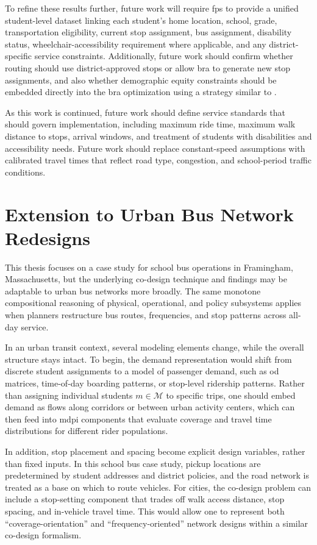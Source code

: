 To refine these results further, future work will require \gls{fps} to provide a unified student-level dataset linking each student's home location, school, grade, transportation eligibility, current stop assignment, bus assignment, disability status, wheelchair-accessibility requirement where applicable, and any district-specific service constraints. Additionally, future work should confirm whether routing should use district-approved stops or allow \gls{bra} to generate new stop assignments, and also whether demographic equity constraints should be embedded directly into the \gls{bra} optimization using a strategy similar to \textcite{paviaDesigningEquitableTransit2023}.

As this work is continued, future work should define service standards that should govern implementation, including maximum ride time, maximum walk distance to stops, arrival windows, and treatment of students with disabilities and accessibility needs. Future work should replace constant-speed assumptions with calibrated travel times that reflect road type, congestion, and school-period traffic conditions.

\section{Extension to Urban Bus Network Redesigns}

This thesis focuses on a case study for school bus operations in Framingham, Massachusetts, but the underlying co-design technique and findings may be adaptable to urban bus networks more broadly. The same monotone compositional reasoning of physical, operational, and policy subsystems applies when planners restructure bus routes, frequencies, and stop patterns across all-day service.

In an urban transit context, several modeling elements change, while the overall structure stays intact. To begin, the demand representation would shift from discrete student assignments to a model of passenger demand, such as \gls{od} matrices, time-of-day boarding patterns, or stop-level ridership patterns. Rather than assigning individual students $m\in\mathcal{M}$ to specific trips, one should embed demand as flows along corridors or between urban activity centers, which can then feed into \gls{mdpi} components that evaluate coverage and travel time distributions for different rider populations.

In addition, stop placement and spacing become explicit design variables, rather than fixed inputs. In this school bus case study, pickup locations are predetermined by student addresses and district policies, and the road network is treated as a base on which to route vehicles. For cities, the co-design problem can include a stop-setting component that trades off walk access distance, stop spacing, and in-vehicle travel time. This would allow one to represent both ``coverage-orientation'' and ``frequency-oriented'' network designs within a similar co-design formalism.

